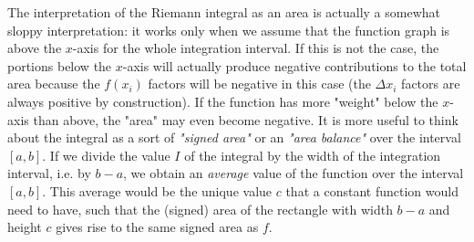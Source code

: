 \medskip
The interpretation of the Riemann integral as an area is actually a somewhat sloppy interpretation: it works only when we assume that the function graph is above the $x$-axis for the whole integration interval. If this is not the case, the portions below the $x$-axis will actually produce negative contributions to the total area because the $f(x_i)$ factors will be negative in this case (the $\Delta x_i$ factors are always positive by construction). If the function has more "weight" below the $x$-axis than above, the "area" may even become negative. It is more useful to think about the integral as a sort of \emph{"signed area"} or an \emph{"area balance"} over the interval $[a,b]$. If we divide the value $I$ of the integral by the width of the integration interval, i.e. by $b-a$, we obtain an \emph{average} value of the function over the interval $[a,b]$. This average would be the unique value $c$ that a constant function would need to have, such that the (signed) area of the rectangle with width $b-a$ and height $c$ gives rise to the same signed area as $f$.





